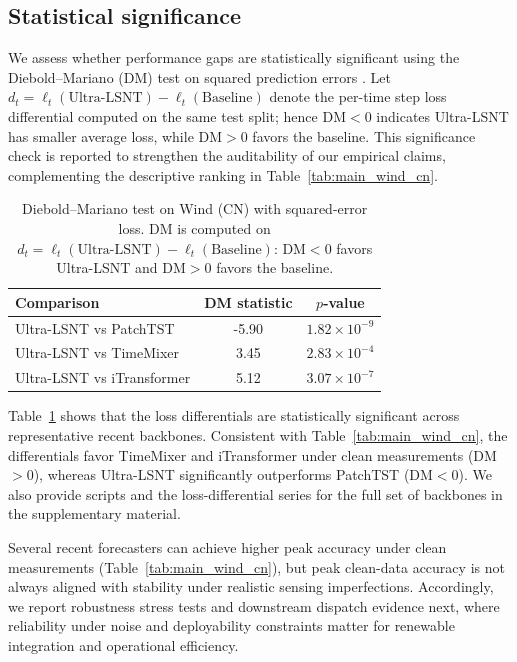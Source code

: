 \documentclass[review,3p,times]{elsarticle}
\begin{document}
\subsection{Statistical significance}
\label{subsec:results_significance}
We assess whether performance gaps are statistically significant using the Diebold--Mariano (DM) test on squared prediction errors \cite{diebold1995}.
Let $d_t=\ell_t(\text{Ultra-LSNT})-\ell_t(\text{Baseline})$ denote the per-time step loss differential computed on the same test split; hence DM$<0$ indicates Ultra-LSNT has smaller average loss, while DM$>0$ favors the baseline.
This significance check is reported to strengthen the auditability of our empirical claims, complementing the descriptive ranking in Table~\ref{tab:main_wind_cn}.

\begin{table}[t]
\centering
\caption{Diebold--Mariano test on Wind (CN) with squared-error loss. DM is computed on $d_t=\ell_t(\text{Ultra-LSNT})-\ell_t(\text{Baseline})$: DM$<0$ favors Ultra-LSNT and DM$>0$ favors the baseline.}
\label{tab:dm_test}
\begin{tabular}{lcc}
\toprule
Comparison & DM statistic & $p$-value \\
\midrule
Ultra-LSNT vs PatchTST & -5.90 & $1.82 \times 10^{-9}$ \\
Ultra-LSNT vs TimeMixer & 3.45 & $2.83 \times 10^{-4}$ \\
Ultra-LSNT vs iTransformer & 5.12 & $3.07 \times 10^{-7}$ \\
\bottomrule
\end{tabular}
\end{table}
Table~\ref{tab:dm_test} shows that the loss differentials are statistically significant across representative recent backbones.
Consistent with Table~\ref{tab:main_wind_cn}, the differentials favor TimeMixer and iTransformer under clean measurements (DM$>0$), whereas Ultra-LSNT significantly outperforms PatchTST (DM$<0$).
We also provide scripts and the loss-differential series for the full set of backbones in the supplementary material.

Several recent forecasters can achieve higher peak accuracy under clean measurements (Table~\ref{tab:main_wind_cn}), but peak clean-data accuracy is not always aligned with stability under realistic sensing imperfections.
Accordingly, we report robustness stress tests and downstream dispatch evidence next, where reliability under noise and deployability constraints matter for renewable integration and operational efficiency.
\end{document}

